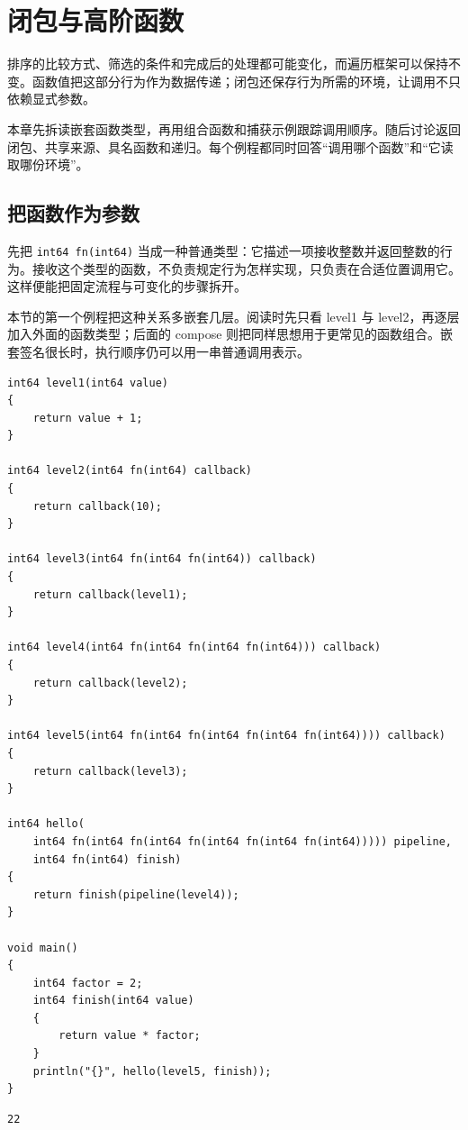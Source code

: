 \chapter{闭包与高阶函数}
\label{ch:15}

排序的比较方式、筛选的条件和完成后的处理都可能变化，而遍历框架可以保持不变。函数值把这部分行为作为数据传递；闭包还保存行为所需的环境，让调用不只依赖显式参数。

本章先拆读嵌套函数类型，再用组合函数和捕获示例跟踪调用顺序。随后讨论返回闭包、共享来源、具名函数和递归。每个例程都同时回答“调用哪个函数”和“它读取哪份环境”。

\section{把函数作为参数}

先把 \texttt{int64 fn(\allowbreak{}int64)\allowbreak{}} 当成一种普通类型：它描述一项接收整数并返回整数的行为。接收这个类型的函数，不负责规定行为怎样实现，只负责在合适位置调用它。这样便能把固定流程与可变化的步骤拆开。

本节的第一个例程把这种关系多嵌套几层。阅读时先只看 level1 与 level2，再逐层加入外面的函数类型；后面的 compose 则把同样思想用于更常见的函数组合。嵌套签名很长时，执行顺序仍可以用一串普通调用表示。

\par
\medskip
\begin{lstlisting}[style=chali]
int64 level1(int64 value)
{
    return value + 1;
}

int64 level2(int64 fn(int64) callback)
{
    return callback(10);
}

int64 level3(int64 fn(int64 fn(int64)) callback)
{
    return callback(level1);
}

int64 level4(int64 fn(int64 fn(int64 fn(int64))) callback)
{
    return callback(level2);
}

int64 level5(int64 fn(int64 fn(int64 fn(int64 fn(int64)))) callback)
{
    return callback(level3);
}

int64 hello(
    int64 fn(int64 fn(int64 fn(int64 fn(int64 fn(int64))))) pipeline,
    int64 fn(int64) finish)
{
    return finish(pipeline(level4));
}

void main()
{
    int64 factor = 2;
    int64 finish(int64 value)
    {
        return value * factor;
    }
    println("{}", hello(level5, finish));
}
\end{lstlisting}
\par
\medskip

\par
\medskip
\begin{lstlisting}[style=out]
22
\end{lstlisting}
\par
\medskip

